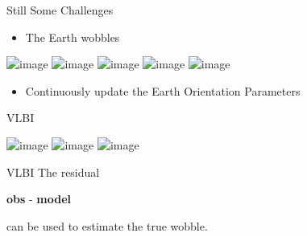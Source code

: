 \documentclass[12pt,table,t]{beamer}
\begin{document}
\begin{frame}[c]{Still Some Challenges}

  \begin{itemize}
  \item The Earth wobbles
  \end{itemize}
  
  \begin{center}
    \includegraphics<1>[width=0.4\textwidth]{figure/cheers_01}
    \includegraphics<2>[width=0.3\textwidth]{figure/drunk_01}
    \includegraphics<3>[width=0.3\textwidth]{figure/drunk_02}
    \includegraphics<4>[width=0.3\textwidth]{figure/drunk_01}
    \includegraphics<5>[width=0.3\textwidth]{figure/drunk_02}
  \end{center}

  \begin{itemize}
  \item<5-> Continuously update the Earth Orientation Parameters
  \end{itemize}
\end{frame}


\begin{frame}[c]{VLBI}
  \begin{center}
    \includegraphics<1>[width=\textwidth]{figure/vlbi_concept_01}
    \includegraphics<2>[width=\textwidth]{figure/vlbi_concept_02}
    \includegraphics<3->[width=\textwidth]{figure/vlbi_concept_03}
  \end{center}

\end{frame}


\begin{frame}[c]{VLBI}
  The residual

  \begin{center}
    \textbf{obs} - \textbf{model}
  \end{center}

  can be used to estimate the true wobble.

\end{frame}
\end{document}
